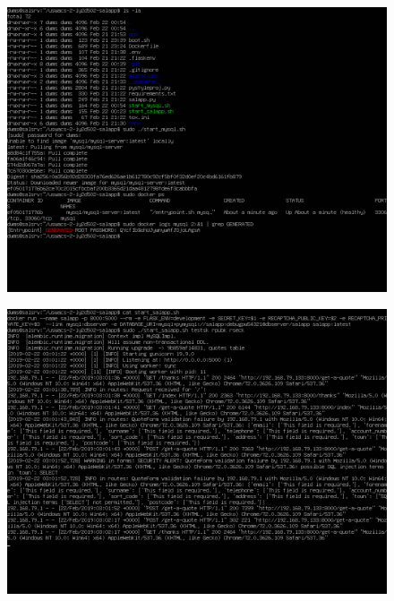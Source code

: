 \begin{figure}[h!]
\centering
\captionsetup{skip=\skipfigurecaptionlen}
\includegraphics[width=1\textwidth]{screenshots/IY2D502-2019-02-22-00-58-41.png}
\caption{}
\label{fig:IY2D502-2019-02-22-00-58-41}
\end{figure}
\pagebreak
\begin{figure}[h!]
\centering
\captionsetup{skip=\skipfigurecaptionlen}
\includegraphics[width=1\textwidth]{screenshots/IY2D502-2019-02-22-03-02-25.png}
\caption{}
\label{fig:IY2D502-2019-02-22-03-02-25}
\end{figure}
\pagebreak
